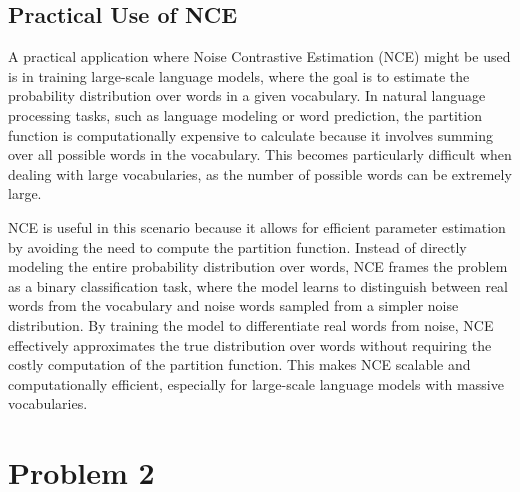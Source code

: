 \documentclass{article}
\begin{document}
\subsection{Practical Use of NCE}
A practical application where Noise Contrastive Estimation (NCE) might be used is in training large-scale language models, where the goal is to estimate the probability distribution over words in a given vocabulary. In natural language processing tasks, such as language modeling or word prediction, the partition function is computationally expensive to calculate because it involves summing over all possible words in the vocabulary. This becomes particularly difficult when dealing with large vocabularies, as the number of possible words can be extremely large.

NCE is useful in this scenario because it allows for efficient parameter estimation by avoiding the need to compute the partition function. Instead of directly modeling the entire probability distribution over words, NCE frames the problem as a binary classification task, where the model learns to distinguish between real words from the vocabulary and noise words sampled from a simpler noise distribution. By training the model to differentiate real words from noise, NCE effectively approximates the true distribution over words without requiring the costly computation of the partition function. This makes NCE scalable and computationally efficient, especially for large-scale language models with massive vocabularies.
\section{Problem 2}
\end{document}
